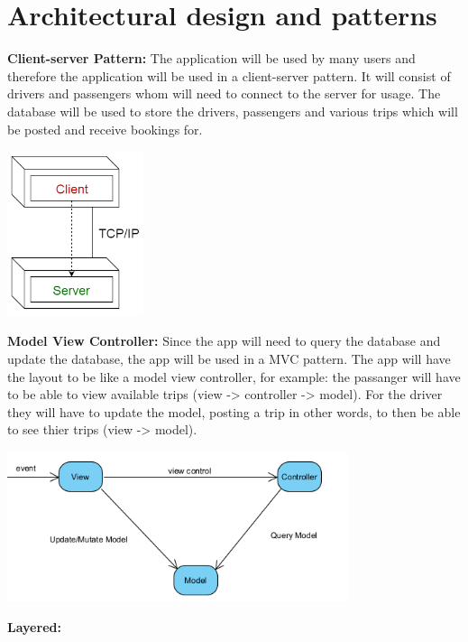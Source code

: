 \documentclass[hidelinks, 12pt, a4paper]{article}
\begin{document}
\section{Architectural design and patterns}
\textbf{Client-server Pattern:}
\newline
The application will be used by many users and therefore the application will be used in a client-server pattern.
It will consist of drivers and passengers whom will need to connect to the server for usage.
The database will be used to store the drivers, passengers and various trips which will be posted and receive bookings for.
\begin{center}
    \noindent
    \includegraphics[width=4cm]{images/client_server.png}
    \vspace{0.5cm}
\end{center}
\textbf{Model View Controller:}
\newline
Since the app will need to query the database and update the database, the app will be used in a MVC pattern.
The app will have the layout to be like a model view controller, for example: the passanger will have to be able to view available trips (view -> controller -> model).
For the driver they will have to update the model, posting a trip in other words, to then be able to see thier trips (view -> model).
\begin{center}
    \noindent
    \includegraphics[width=10cm]{images/model_view_controller.png}
    \vspace{0.5cm}
\end{center}
\textbf{Layered:}
\newline
\end{document}
